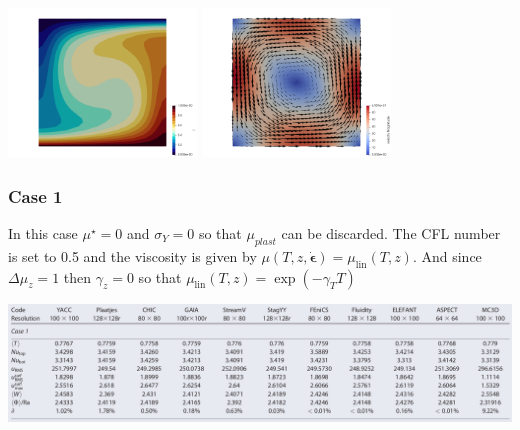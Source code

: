 \includegraphics[width=5cm]{python_codes/fieldstone_28/results_case0/temp}
\includegraphics[width=5cm]{python_codes/fieldstone_28/results_case0/vel}



\newpage %
\subsubsection{Case 1}

In this case $\mu^\star=0$ and $\sigma_Y=0$ so that $\mu_{plast}$ can be discarded.
The CFL number is set to 0.5 and the viscosity is given by 
$\mu(T,z,\dot{\boldsymbol{\epsilon}}) =   \mu_\text{lin}(T,z) $.
And since $\Delta \mu_z=1$ then $\gamma_z=0$ so that
$\mu_\text{lin} (T,z) = \exp(-\gamma_T T )$


\begin{center}
\includegraphics[width=16cm]{python_codes/fieldstone_28/results_case1/tosn15b}
\end{center}

